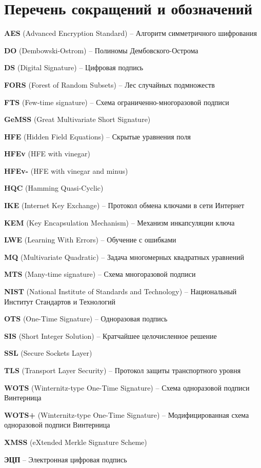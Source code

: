 \section{Перечень сокращений и обозначений}

\textbf{AES} (Advanced Encryption Standard) -- Алгоритм симметричного шифрования

\textbf{DO} (Dembowski-Ostrom) -- Полиномы Дембовского-Острома

\textbf{DS} (Digital Signature) -- Цифровая подпись

\textbf{FORS} (Forest of Random Subsets) -- Лес случайных подмножеств

\textbf{FTS} (Few-time signature) -- Схема ограниченно-многоразовой подписи

\textbf{GeMSS} (Great Multivariate Short Signature)

\textbf{HFE} (Hidden Field Equations) -- Скрытые уравнения поля

\textbf{HFEv} (HFE with vinegar) 

\textbf{HFEv-} (HFE with vinegar and minus) 

\textbf{HQC} (Hamming Quasi-Cyclic) 

\textbf{IKE} (Internet Key Exchange) -- Протокол обмена ключами в сети Интернет

\textbf{KEM} (Key Encapsulation Mechanism) -- Механизм инкапсуляции ключа

\textbf{LWE} (Learning With Errors) -- Обучение с ошибками

\textbf{MQ} (Multivariate Quadratic) -- Задача многомерных квадратных уравнений

\textbf{MTS} (Many-time signature) -- Схема многоразовой подписи

\textbf{NIST} (National Institute of Standards and Technology) -- Национальный Институт Стандартов и Технологий

\textbf{OTS} (One-Time Signature) -- Одноразовая подпись

\textbf{SIS} (Short Integer Solution) -- Кратчайшее целочисленное решение

\textbf{SSL} (Secure Sockets Layer)

\textbf{TLS} (Transport Layer Security) -- Протокол защиты транспортного уровня

\textbf{WOTS} (Winternitz-type One-Time Signature) -- Схема одноразовой подписи Винтерница

\textbf{WOTS+} (Winternitz-type One-Time Signature) -- Модифицированная схема одноразовой подписи Винтерница

\textbf{XMSS} (eXtended Merkle Signature Scheme) 

\textbf{ЭЦП} -- Электронная цифровая подпись

\clearpage